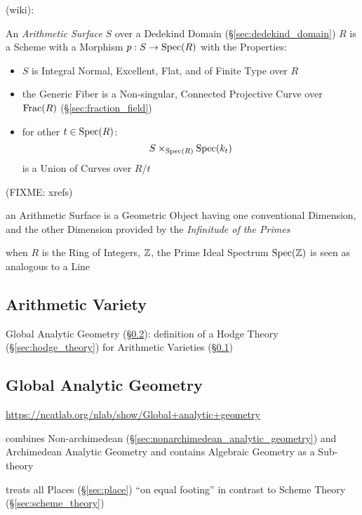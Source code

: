 (wiki):

An \emph{Arithmetic Surface} $S$ over a Dedekind Domain
(\S\ref{sec:dedekind_domain}) $R$ is a Scheme with a Morphism $p : S \rightarrow
\mathrm{Spec}(R)$ with the Properties:
\begin{itemize}
  \item $S$ is Integral Normal, Excellent, Flat, and of Finite Type over $R$
  \item the Generic Fiber is a Non-singular, Connected Projective Curve over
    $\mathrm{Frac}(R)$ (\S\ref{sec:fraction_field})
  \item for other $t \in \mathrm{Spec}(R)$:
    \[
      S \times_{\mathrm{Spec}(R)} \mathrm{Spec}(k_t)
    \]
    is a Union of Curves over $R / t$
\end{itemize}
(FIXME: xrefs)

an Arithmetic Surface is a Geometric Object having one conventional Dimension,
and the other Dimension provided by the \emph{Infinitude of the Primes}

when $R$ is the Ring of Integers, $\mathbb{Z}$, the Prime Ideal Spectrum
$\mathrm{Spec}(\mathbb{Z})$ is seen as analogous to a Line



\subsection{Arithmetic Variety}\label{sec:arithmetic_variety}

Global Analytic Geometry (\S\ref{sec:global_analytic_geometry}): definition of
a Hodge Theory (\S\ref{sec:hodge_theory}) for Arithmetic Varieties
(\S\ref{sec:arithmetic_variety})



\subsection{Global Analytic Geometry}\label{sec:global_analytic_geometry}

\url{https://ncatlab.org/nlab/show/Global+analytic+geometry}

combines Non-archimedean (\S\ref{sec:nonarchimedean_analytic_geometry}) and
Archimedean Analytic Geometry and contains Algebraic Geometry as a Sub-theory

\fist treats all Places (\S\ref{sec:place}) ``on equal footing'' in contrast to
Scheme Theory (\S\ref{sec:scheme_theory})



